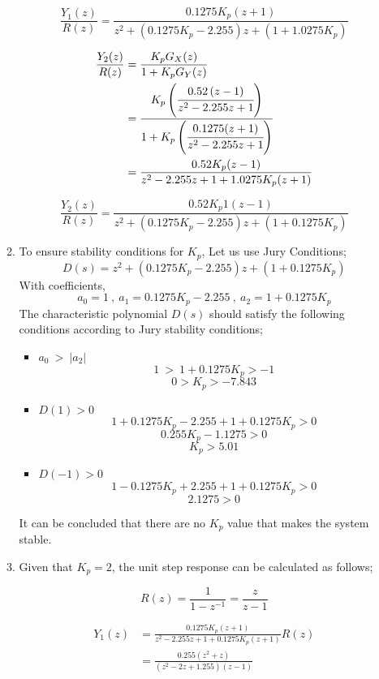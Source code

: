\documentclass[a4paper,12pt]{article}
\begin{document}
\begin{enumerate}
\begin{enumerate}
			$$\boxed{\frac{Y_1(z)}{R(z)} =  \frac{0.1275K_p(z+1)}{z^2+(0.1275K_p-2.255)z+(1+1.0275K_p) }}  $$	
				
			\begin{equation*}
				\begin{split}	
					\frac{Y_2(z)}{R(z)} &= \frac{K_p G_X(z)}{1+K_pG_Y(z)} \\
					& = \cfrac{K_p \left(\cfrac{0.52  \left(z-1 \right)}{z^2-2.255z+1 }\right)}{1+K_p\left(\cfrac{0.1275(z+1)}{z^2-2.255z+1}\right)} \\
					&=\frac{0.52 K_p(z-1 )}{z^2-2.255z+1+1.0275K_p(z+1)}
				\end{split} 
			\end{equation*} 
			
			$$\boxed{\frac{Y_2(z)}{R(z)} =   \frac{0.52 K_p1(z-1 )}{z^2+(0.1275K_p-2.255)z+(1+0.1275K_p) } }   $$	
			
			
			\newpage
		
		
		
		\item To ensure stability conditions for $K_p$, Let us use Jury Conditions;
		$$ D(s)= z^2+(0.1275K_p-2.255)z+(1+0.1275K_p) $$
		With coefficients, 
		$$ \boxed{a_0=1} \ , \ \boxed{a_1=0.1275K_p-2.255} \ ,\ \boxed{a_2=1+0.1275K_p} $$		
		The characteristic polynomial $D(s)$ should satisfy the following conditions according to Jury stability conditions;
		\begin{itemize}
			\item $a_0\ >\ |a_2| $ \\
				$$ 1\ >\ 1+0.1275K_p > -1 $$
				$$\boxed{ 0 > K_p > -7.843 }$$
			\item $D(1)>0$ \\
				$$ 1+0.1275K_p-2.255+1+0.1275K_p > 0$$
				$$ 0.255K_p-1.1275>0$$
				$$ \boxed{ K_p>5.01} $$
			\item $D(-1)>0$ \\
				$$ 1-0.1275K_p+2.255+1+0.1275K_p > 0$$
				$$\boxed{ 2.1275>0 }$$				
		\end{itemize}
		It can be concluded that there are no $K_p$ value that makes the system stable.
		
		
 		\item Given that $K_p=2$, the unit step response can be calculated as follows;
 		
 		$$ R(z)= \frac{1}{1-z^{-1}}=\frac{z}{z-1}  $$
 		
 		\begin{equation*}
 			\begin{split}
	 			Y_1(z) &=  \frac{0.1275K_p(z+1)}{z^2-2.255z+1+0.1275K_p(z+1)} R(z)  \\	
 				&=  \frac{0.255(z^2+z)}{(z^2-2z+1.255)(z-1)} \\ 
 			\end{split}
 		\end{equation*}
 		

\end{enumerate}
\end{enumerate}
\end{document}
